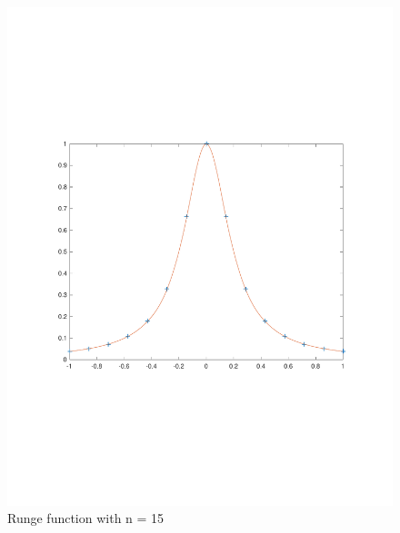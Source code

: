 \documentclass{article}
\begin{document}
\begin{figure}[h]
\centering
\caption{Runge function with n = 15}
\includegraphics[scale=0.6]{runge_n=15}
\end{figure}
\end{document}
